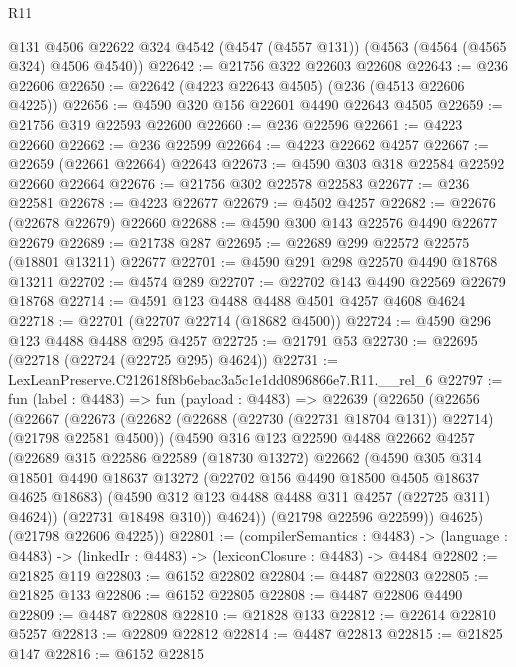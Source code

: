 \begin{lexlean}{R11}
\begin{coremodule}
    @131
    @4506
    @22622
    @324
    @4542
    (@4547 (@4557 @131))
    (@4563 (@4564 (@4565 @324) @4506 @4540))
@22642 := @21756 @322 @22603 @22608
@22643 := @236 @22606
@22650 := @22642 (@4223 @22643 @4505) (@236 (@4513 @22606 @4225))
@22656 := @4590 @320 @156 @22601 @4490 @22643 @4505
@22659 := @21756 @319 @22593 @22600
@22660 := @236 @22596
@22661 := @4223 @22660
@22662 := @236 @22599
@22664 := @4223 @22662 @4257
@22667 := @22659 (@22661 @22664) @22643
@22673 := @4590 @303 @318 @22584 @22592 @22660 @22664
@22676 := @21756 @302 @22578 @22583
@22677 := @236 @22581
@22678 := @4223 @22677
@22679 := @4502 @4257
@22682 := @22676 (@22678 @22679) @22660
@22688 := @4590 @300 @143 @22576 @4490 @22677 @22679
@22689 := @21738 @287
@22695 := @22689 @299 @22572 @22575 (@18801 @13211) @22677
@22701 := @4590 @291 @298 @22570 @4490 @18768 @13211
@22702 := @4574 @289
@22707 := @22702 @143 @4490 @22569 @22679 @18768
@22714 := @4591 @123 @4488 @4488 @4501 @4257 @4608 @4624
@22718 := @22701 (@22707 @22714 (@18682 @4500))
@22724 := @4590 @296 @123 @4488 @4488 @295 @4257
@22725 := @21791 @53
@22730 := @22695 (@22718 (@22724 (@22725 @295) @4624))
@22731 := LexLeanPreserve.C212618f8b6ebac3a5c1e1dd0896866e7.R11.__rel_6
@22797 := fun (label : @4483) =>
  fun (payload : @4483) =>
  @22639
    (@22650
      (@22656
        (@22667
          (@22673
            (@22682 (@22688 (@22730 (@22731 @18704 @131)) @22714) (@21798 @22581 @4500))
            (@4590
              @316
              @123
              @22590
              @4488
              @22662
              @4257
              (@22689
                @315
                @22586
                @22589
                (@18730 @13272)
                @22662
                (@4590
                  @305
                  @314
                  @18501
                  @4490
                  @18637
                  @13272
                  (@22702 @156 @4490 @18500 @4505 @18637 @4625 @18683)
                  (@4590 @312 @123 @4488 @4488 @311 @4257 (@22725 @311) @4624))
                (@22731 @18498 @310))
              @4624))
          (@21798 @22596 @22599))
        @4625)
      (@21798 @22606 @4225))
@22801 := (compilerSemantics : @4483) ->
  (language : @4483) -> (linkedIr : @4483) -> (lexiconClosure : @4483) -> @4484
@22802 := @21825 @119
@22803 := @6152 @22802
@22804 := @4487 @22803
@22805 := @21825 @133
@22806 := @6152 @22805
@22808 := @4487 @22806 @4490
@22809 := @4487 @22808
@22810 := @21828 @133
@22812 := @22614 @22810 @5257
@22813 := @22809 @22812
@22814 := @4487 @22813
@22815 := @21825 @147
@22816 := @6152 @22815

\end{coremodule}
\end{lexlean}
